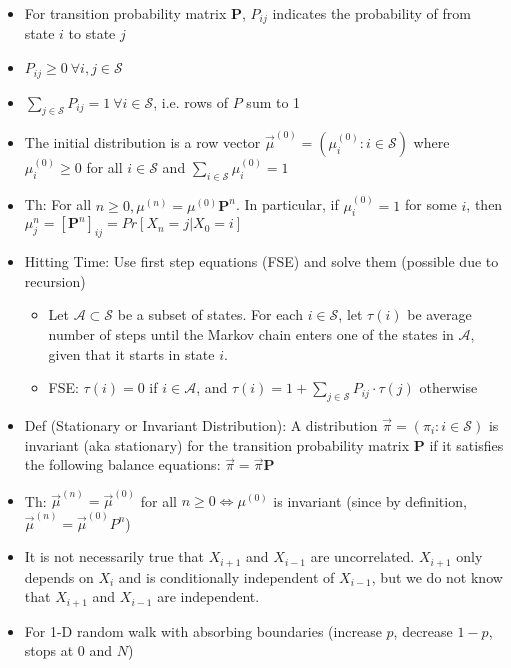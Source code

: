 \documentclass{article}
\begin{document}
{\color{blue} }
\begin{itemize}
	\item For transition probability matrix $\mathbf{P}$, $P_{ij}$ indicates the probability of from state $i$ to state $j$
	\item $P_{ij} \geq 0\ \forall i,j\in\mathscr{S}$
	\item $\sum\limits_{j\in\mathscr{S}} P_{ij} = 1\ \forall i\in\mathscr{S}$, i.e. rows of $P$ sum to 1
	\item The initial distribution is a row vector $\vec{\mu}^{(0)} = (\mu_i^{(0)}:i\in\mathscr{S})$ where $\mu_i^{(0)} \geq 0$ for all $i\in\mathscr{S}$ and $\sum_{i\in\mathscr{S}} \mu_i^{(0)} = 1$
	\item Th: For all $n\geq 0, \mu^{(n)} = \mu^{(0)} \mathbf{P}^{n}$. In particular, if $\mu_i^{(0)} = 1$ for some $i$, then $\mu_j^{n} = [\mathbf{P}^n]_{ij} = Pr[X_n = j | X_0 = i]$
	\item Hitting Time: Use first step equations (FSE) and solve them (possible due to recursion)
	\begin{itemize}
		\item Let $\mathscr{A}\subset \mathscr{S}$ be a subset of states. For each $i\in\mathscr{S}$, let $\tau(i)$ be average number of steps until the Markov chain enters one of the states in $\mathscr{A}$, given that it starts in state $i$.
		\item FSE: $\tau(i) = 0$ if $i\in\mathscr{A}$, and $\tau(i) = 1 + \sum\limits_{j\in\mathscr{S}} P_{ij}\cdot\tau(j)$ otherwise
	\end{itemize}
	\item Def (Stationary or Invariant Distribution): A distribution $\vec{\pi} = (\pi_i: i\in\mathscr{S})$ is invariant (aka stationary) for the transition probability matrix $\mathbf{P}$ if it satisfies the following {\color{blue} balance equations}: $\vec{\pi} = \vec{\pi}\mathbf{P}$
	\item Th: $\vec{\mu}^{(n)} = \vec{\mu}^{(0)}$ for all $n\geq 0 \iff \mu^{(0)}$ is invariant (since by definition, $\vec{\mu}^{(n)} = \vec{\mu}^{(0)} P^n$)
	\item It is not necessarily true that $X_{i+1}$ and $X_{i-1}$ are uncorrelated. $X_{i+1}$ only depends on $X_{i}$ and is conditionally independent of $X_{i-1}$, but we do not know that $X_{i+1}$ and $X_{i-1}$ are independent.
	\item For 1-D random walk with absorbing boundaries (increase $p$, decrease $1-p$, stops at $0$ and $N$)
	\begin{itemize}

\end{itemize}
\end{itemize}
\end{document}
